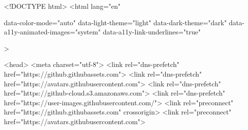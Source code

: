 





<!DOCTYPE html>
<html
  lang="en"
  
  data-color-mode="auto" data-light-theme="light" data-dark-theme="dark"
  data-a11y-animated-images="system" data-a11y-link-underlines="true"
  
  >



  <head>
    <meta charset="utf-8">
  <link rel="dns-prefetch" href="https://github.githubassets.com">
  <link rel="dns-prefetch" href="https://avatars.githubusercontent.com">
  <link rel="dns-prefetch" href="https://github-cloud.s3.amazonaws.com">
  <link rel="dns-prefetch" href="https://user-images.githubusercontent.com/">
  <link rel="preconnect" href="https://github.githubassets.com" crossorigin>
  <link rel="preconnect" href="https://avatars.githubusercontent.com">

  


